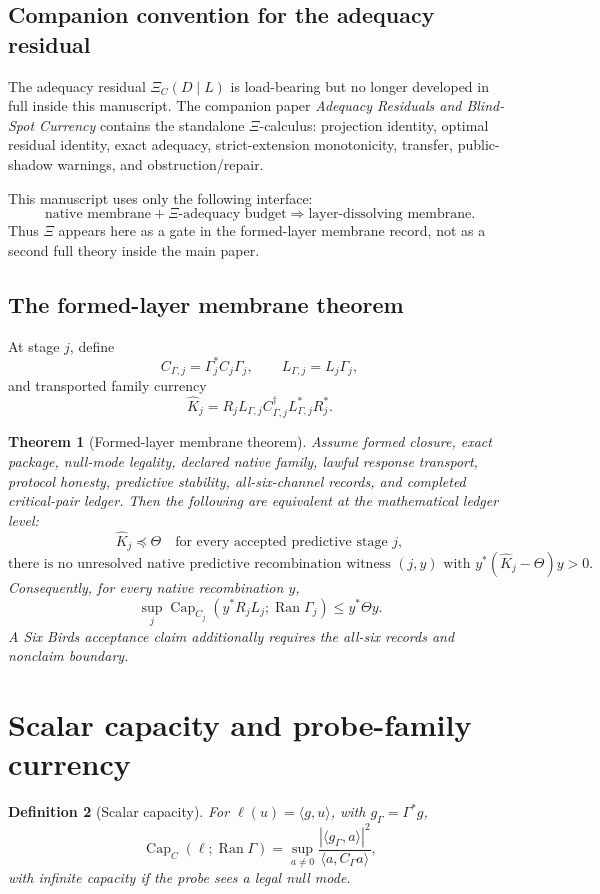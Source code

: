 \documentclass[11pt]{article}
\newtheorem{theorem}{Theorem}[section]
\newtheorem{definition}[theorem]{Definition}
\DeclareMathOperator{\range}{Ran}
\DeclareMathOperator{\Capacity}{Cap}
\newcommand{\Loewner}{\preceq}
\begin{document}
\subsection{Companion convention for the adequacy residual}
The adequacy residual \(\Xi_C(D\mid L)\) is load-bearing but no longer developed in full inside this manuscript.  The companion paper
\emph{Adequacy Residuals and Blind-Spot Currency}
contains the standalone \(\Xi\)-calculus: projection identity, optimal residual identity, exact adequacy, strict-extension monotonicity, transfer, public-shadow warnings, and obstruction/repair.

This manuscript uses only the following interface:
\[
  \boxed{\text{native membrane} + \Xi\text{-adequacy budget}
  \Rightarrow \text{layer-dissolving membrane}.}
\]
Thus \(\Xi\) appears here as a gate in the formed-layer membrane record, not as a second full theory inside the main paper.

\subsection{The formed-layer membrane theorem}
At stage \(j\), define
\[
  C_{\Gamma,j}=\Gamma_j^*C_j\Gamma_j,
  \qquad
  L_{\Gamma,j}=L_j\Gamma_j,
\]
and transported family currency
\[
  \widehat K_j
  =R_jL_{\Gamma,j}C_{\Gamma,j}^\dagger L_{\Gamma,j}^*R_j^*.
\]

\begin{theorem}[Formed-layer membrane theorem]
Assume formed closure, exact package, null-mode legality, declared native family, lawful response transport, protocol honesty, predictive stability, all-six-channel records, and completed critical-pair ledger.  Then the following are equivalent at the mathematical ledger level:
\[
  \widehat K_j\Loewner\Theta\quad\text{for every accepted predictive stage }j,
\]
\[
  \text{there is no unresolved native predictive recombination witness }(j,y)
  \text{ with }y^*(\widehat K_j-\Theta)y>0.
\]
Consequently, for every native recombination \(y\),
\[
  \sup_j \Capacity_{C_j}(y^*R_jL_j;\range\Gamma_j)\le y^*\Theta y.
\]
A Six Birds acceptance claim additionally requires the all-six records and nonclaim boundary.
\end{theorem}

\section{Scalar capacity and probe-family currency}

\begin{definition}[Scalar capacity]
For \(\ell(u)=\langle g,u\rangle\), with \(g_\Gamma=\Gamma^*g\),
\[
  \Capacity_C(\ell;\range\Gamma)=
  \sup_{a\ne0}\frac{|\langle g_\Gamma,a\rangle|^2}{\langle a,C_\Gamma a\rangle},
\]
with infinite capacity if the probe sees a legal null mode.
\end{definition}
\end{document}
